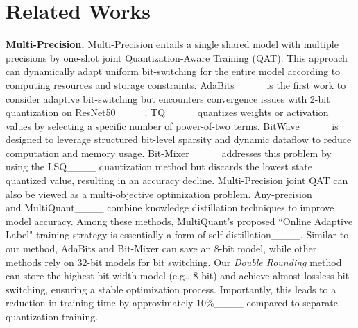 \section{Related Works}

{\bf Multi-Precision.}
Multi-Precision entails a single shared model with multiple precisions by one-shot joint Quantization-Aware Training (QAT). This approach can dynamically adapt uniform bit-switching for the entire model according to computing resources and storage constraints. AdaBits____ is the first work to consider adaptive bit-switching but encounters convergence issues with 2-bit quantization on ResNet50____. TQ____ quantizes weights or activation values by selecting a specific number of power-of-two terms. BitWave____ is designed to leverage structured bit-level sparsity and dynamic dataflow to reduce computation and memory usage. Bit-Mixer____ addresses this problem by using the LSQ____ quantization method but discards the lowest state quantized value, resulting in an accuracy decline. Multi-Precision joint QAT can also be viewed as a multi-objective optimization problem. Any-precision____ and MultiQuant____ combine knowledge distillation techniques to improve model accuracy. Among these methods, MultiQuant's proposed ``Online Adaptive Label" training strategy is essentially a form of self-distillation____. Similar to our method, AdaBits and Bit-Mixer can save an 8-bit model, while other methods rely on 32-bit models for bit switching. Our \emph{Double Rounding} method can store the highest bit-width model (e.g., 8-bit) and achieve almost lossless bit-switching, ensuring a stable optimization process. Importantly, this leads to a reduction in training time by approximately 10\%____ compared to separate quantization training.

